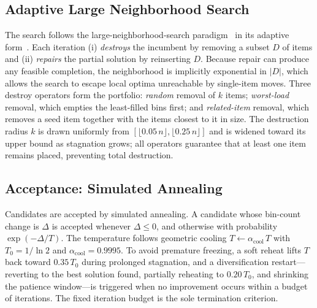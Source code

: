 \documentclass[conference]{IEEEtran}
\begin{document}
\subsection{Adaptive Large Neighborhood Search}
The search follows the large-neighborhood-search paradigm~\cite{bShaw} in its
adaptive form~\cite{bRopke}. Each iteration (i) \emph{destroys} the incumbent by
removing a subset $D$ of items and (ii) \emph{repairs} the partial solution by
reinserting $D$. Because repair can produce any feasible completion, the
neighborhood is implicitly exponential in $|D|$, which allows the search to escape
local optima unreachable by single-item moves. Three destroy operators form the
portfolio: \emph{random} removal of $k$ items; \emph{worst-load} removal, which
empties the least-filled bins first; and \emph{related-item} removal, which
removes a seed item together with the items closest to it in size. The destruction
radius $k$ is drawn uniformly from $[\lfloor 0.05\,n\rfloor,\lfloor 0.25\,n\rfloor]$
and is widened toward its upper bound as stagnation grows; all operators guarantee
that at least one item remains placed, preventing total destruction.

\subsection{Acceptance: Simulated Annealing}
Candidates are accepted by simulated annealing. A candidate whose bin-count change
is $\Delta$ is accepted whenever $\Delta\le 0$, and otherwise with probability
$\exp(-\Delta/T)$. The temperature follows geometric cooling
$T\leftarrow \alpha_{\mathrm{cool}}\,T$ with $T_0=1/\ln 2$ and
$\alpha_{\mathrm{cool}}=0.9995$. To avoid premature freezing, a soft reheat lifts
$T$ back toward $0.35\,T_0$ during prolonged stagnation, and a diversification
restart---reverting to the best solution found, partially reheating to
$0.20\,T_0$, and shrinking the patience window---is triggered when no improvement
occurs within a budget of iterations. The fixed iteration budget is the sole
termination criterion.
\end{document}
